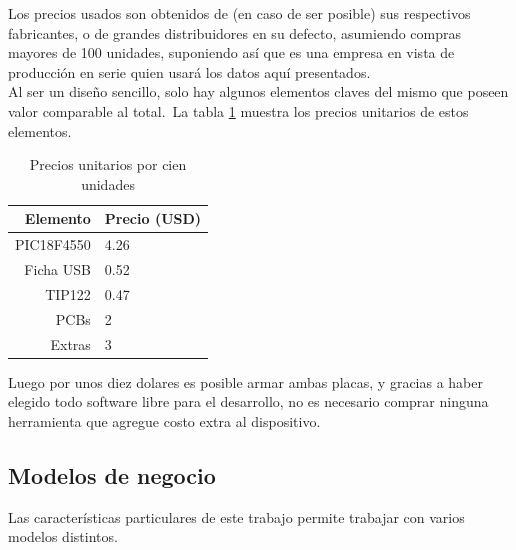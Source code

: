 Los precios usados son obtenidos de (en caso de ser posible) sus respectivos
fabricantes, o de grandes distribuidores en su defecto, asumiendo compras
mayores de 100 unidades, suponiendo as\'i que es una empresa en vista de
producci\'on en serie quien usar\'a los datos aqu\'i presentados.\\






Al ser un dise\~no sencillo, solo hay algunos elementos claves del mismo que
poseen valor comparable al total.\ 
La tabla \ref{tab:element_cost} muestra los precios unitarios de estos
elementos.


\begin{table}[ht]
\centering
\begin{tabular}{r|l}
Elemento    & Precio (USD) 	\\ \hline
PIC18F4550  & 4.26			\\
Ficha USB   & 0.52			\\
TIP122      & 0.47			\\
PCBs        & 2				\\
Extras		& 3				\\
\end{tabular}
\caption{Precios unitarios por cien unidades} 
\label{tab:element_cost}
\end{table}


Luego por unos diez dolares es posible armar ambas placas, y gracias a haber
elegido todo software libre para el desarrollo, no es necesario comprar ninguna
herramienta que agregue costo extra al dispositivo.\\

\subsection{Modelos de negocio}

Las caracter\'isticas particulares de este trabajo permite trabajar con varios
modelos distintos.\\


